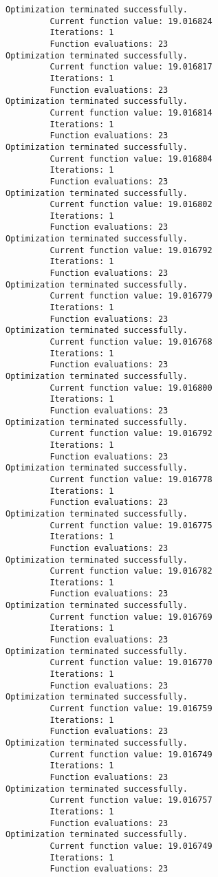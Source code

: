 \documentclass[11pt]{article}
\begin{document}
\begin{Verbatim}[commandchars=\\\{\}]
Optimization terminated successfully.
         Current function value: 19.016824
         Iterations: 1
         Function evaluations: 23
Optimization terminated successfully.
         Current function value: 19.016817
         Iterations: 1
         Function evaluations: 23
Optimization terminated successfully.
         Current function value: 19.016814
         Iterations: 1
         Function evaluations: 23
Optimization terminated successfully.
         Current function value: 19.016804
         Iterations: 1
         Function evaluations: 23
Optimization terminated successfully.
         Current function value: 19.016802
         Iterations: 1
         Function evaluations: 23
Optimization terminated successfully.
         Current function value: 19.016792
         Iterations: 1
         Function evaluations: 23
Optimization terminated successfully.
         Current function value: 19.016779
         Iterations: 1
         Function evaluations: 23
Optimization terminated successfully.
         Current function value: 19.016768
         Iterations: 1
         Function evaluations: 23
Optimization terminated successfully.
         Current function value: 19.016800
         Iterations: 1
         Function evaluations: 23
Optimization terminated successfully.
         Current function value: 19.016792
         Iterations: 1
         Function evaluations: 23
Optimization terminated successfully.
         Current function value: 19.016778
         Iterations: 1
         Function evaluations: 23
Optimization terminated successfully.
         Current function value: 19.016775
         Iterations: 1
         Function evaluations: 23
Optimization terminated successfully.
         Current function value: 19.016782
         Iterations: 1
         Function evaluations: 23
Optimization terminated successfully.
         Current function value: 19.016769
         Iterations: 1
         Function evaluations: 23
Optimization terminated successfully.
         Current function value: 19.016770
         Iterations: 1
         Function evaluations: 23
Optimization terminated successfully.
         Current function value: 19.016759
         Iterations: 1
         Function evaluations: 23
Optimization terminated successfully.
         Current function value: 19.016749
         Iterations: 1
         Function evaluations: 23
Optimization terminated successfully.
         Current function value: 19.016757
         Iterations: 1
         Function evaluations: 23
Optimization terminated successfully.
         Current function value: 19.016749
         Iterations: 1
         Function evaluations: 23

\end{Verbatim}
\end{document}
